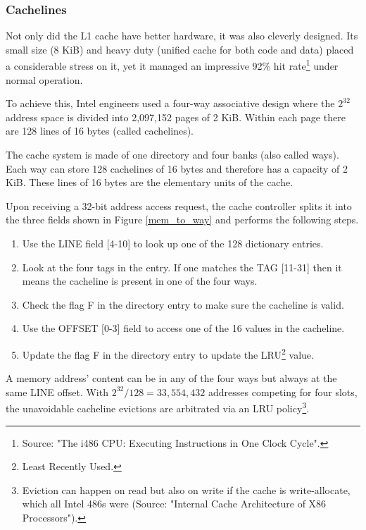 \subsubsection{Cachelines}
Not only did the L1 cache have better hardware, it was also cleverly designed. Its small size (8 KiB) and heavy duty (unified cache for both code and data) placed a considerable stress on it, yet it managed an impressive 92\% hit rate\footnote{Source: "The i486 CPU: Executing Instructions in One Clock Cycle".} under normal operation.\\
\par
To achieve this, Intel engineers used a four-way associative design where the $2^{32}$ address space is divided into 2,097,152 pages of 2 KiB. Within each page there are 128 lines of 16 bytes (called cachelines).\\
\par
{}
\par
The cache system is made of one directory and four banks (also called ways). Each way can store 128 cachelines of 16 bytes and therefore has a capacity of 2 KiB. These lines of 16 bytes are the elementary units of the cache.\\
\par
Upon receiving a 32-bit address access request, the cache controller splits it into the three fields shown in Figure \ref{mem_to_way} and performs the following steps.
\begin{enumerate}
\item Use the LINE field [4-10] to look up one of the 128 dictionary entries.
\item Look at the four tags in the entry. If one matches the TAG [11-31] then it means the cacheline is present in one of the four ways.
\item Check the flag F in the directory entry to make sure the cacheline is valid.
\item Use the OFFSET [0-3] field to access one of the 16 values in the cacheline.
\item Update the flag F in the directory entry to update the LRU\footnote{Least Recently Used.}  value.
\end{enumerate}
\par
A memory address' content can be in any of the four ways but always at the same LINE offset. With $2^{32} / 128 = 33,554,432$ addresses competing for four slots, the unavoidable cacheline evictions are arbitrated via an LRU policy\footnote{Eviction can happen on read but also on write if the cache is write-allocate, which all Intel 486s were (Source: "Internal Cache Architecture of X86 Processors").}.\\
